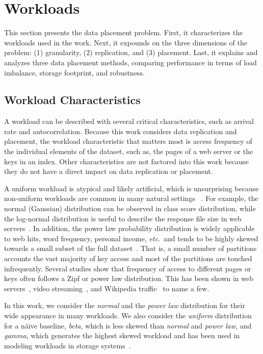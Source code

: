 \section{Workloads}
\label{sec:approach}

This section presents the data placement problem.
First, it characterizes the workloads used in the work.
Next, it expounds on the three dimensions of the problem:
(1) granularity, (2) replication, and (3) placement.
Last, it explains and analyzes three data placement methods,
comparing
performance in terms of load imbalance, storage footprint, and robustness.

\subsection{Workload Characteristics}
\label{sec:workloads}

A workload can be described with several critical characteristics,
such as arrival rate and autocorrelation.
Because this work considers data replication and placement, 
the workload characteristic that matters most is access frequency of the
individual elements of the
dataset, such as, the pages of a web server or the keys in an index.
Other characteristics are not factored into
this work because they do not have a direct impact on data replication
or placement.

A uniform workload is atypical and likely artificial,
which is unsurprising because
non-uniform workloads are common in many natural settings
~\cite{Pavlo2012}.
For example, the normal (Gaussian) distribution can be observed
in class score distribution,
while the log-normal distribution is useful to describe
the response file size in web servers~\cite{Barford1998}.
In addition, the power law probability distribution is widely applicable to
web hits, word frequency, personal income, \emph{etc}.\ and tends to
be highly skewed towards a small subset of the full
dataset~\cite{Newman2005}.
That is, a small number of partitions accounts the vast majority of key access
and most of the partitions are touched infrequently. 
Several studies show that frequency of access to different pages or
keys often follows a Zipf or power law distribution.
This has been shown in web servers~\cite{dilley1998web,panteleenko2003web},
video streaming~\cite{sripanidkulchai2004analysis}, 
and Wikipedia traffic~\cite{urdaneta2009wikipedia} to name a few.

In this work, we consider the
\emph{normal} and the \emph{power law} distribution for their
wide appearance in many workloads.
We also consider the \emph{uniform} distribution for a n\"aive baseline,
\emph{beta}, which is less skewed than
\emph{normal} and \emph{power law}, and
\emph{gamma}, which generates the highest skewed workload and
has been used in modeling workloads in storage systems~\cite{Wilkes2001}.


